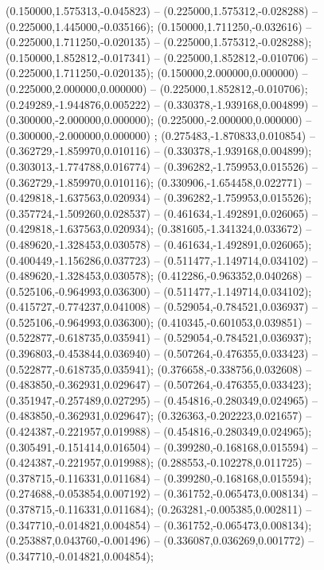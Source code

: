  (0.150000,1.575313,-0.045823) -- (0.225000,1.575312,-0.028288) -- (0.225000,1.445000,-0.035166);
 (0.150000,1.711250,-0.032616) -- (0.225000,1.711250,-0.020135) -- (0.225000,1.575312,-0.028288);
 (0.150000,1.852812,-0.017341) -- (0.225000,1.852812,-0.010706) -- (0.225000,1.711250,-0.020135);
 (0.150000,2.000000,0.000000) -- (0.225000,2.000000,0.000000) -- (0.225000,1.852812,-0.010706);
 (0.249289,-1.944876,0.005222) -- (0.330378,-1.939168,0.004899) -- (0.300000,-2.000000,0.000000);
 (0.225000,-2.000000,0.000000) -- (0.300000,-2.000000,0.000000) ;
 (0.275483,-1.870833,0.010854) -- (0.362729,-1.859970,0.010116) -- (0.330378,-1.939168,0.004899);
 (0.303013,-1.774788,0.016774) -- (0.396282,-1.759953,0.015526) -- (0.362729,-1.859970,0.010116);
 (0.330906,-1.654458,0.022771) -- (0.429818,-1.637563,0.020934) -- (0.396282,-1.759953,0.015526);
 (0.357724,-1.509260,0.028537) -- (0.461634,-1.492891,0.026065) -- (0.429818,-1.637563,0.020934);
 (0.381605,-1.341324,0.033672) -- (0.489620,-1.328453,0.030578) -- (0.461634,-1.492891,0.026065);
 (0.400449,-1.156286,0.037723) -- (0.511477,-1.149714,0.034102) -- (0.489620,-1.328453,0.030578);
 (0.412286,-0.963352,0.040268) -- (0.525106,-0.964993,0.036300) -- (0.511477,-1.149714,0.034102);
 (0.415727,-0.774237,0.041008) -- (0.529054,-0.784521,0.036937) -- (0.525106,-0.964993,0.036300);
 (0.410345,-0.601053,0.039851) -- (0.522877,-0.618735,0.035941) -- (0.529054,-0.784521,0.036937);
 (0.396803,-0.453844,0.036940) -- (0.507264,-0.476355,0.033423) -- (0.522877,-0.618735,0.035941);
 (0.376658,-0.338756,0.032608) -- (0.483850,-0.362931,0.029647) -- (0.507264,-0.476355,0.033423);
 (0.351947,-0.257489,0.027295) -- (0.454816,-0.280349,0.024965) -- (0.483850,-0.362931,0.029647);
 (0.326363,-0.202223,0.021657) -- (0.424387,-0.221957,0.019988) -- (0.454816,-0.280349,0.024965);
 (0.305491,-0.151414,0.016504) -- (0.399280,-0.168168,0.015594) -- (0.424387,-0.221957,0.019988);
 (0.288553,-0.102278,0.011725) -- (0.378715,-0.116331,0.011684) -- (0.399280,-0.168168,0.015594);
 (0.274688,-0.053854,0.007192) -- (0.361752,-0.065473,0.008134) -- (0.378715,-0.116331,0.011684);
 (0.263281,-0.005385,0.002811) -- (0.347710,-0.014821,0.004854) -- (0.361752,-0.065473,0.008134);
 (0.253887,0.043760,-0.001496) -- (0.336087,0.036269,0.001772) -- (0.347710,-0.014821,0.004854);
